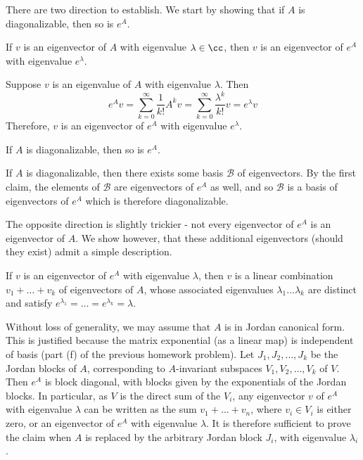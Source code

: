 \documentclass{scrartcl}
\begin{document}
\begin{solution} 
        There are two direction to establish. We start by showing that if $A$ is diagonalizable, then so is $e^A$.
        \begin{lemma}
        If $v$ is an eigenvector of $A$ with eigenvalue $\lambda\in \cc$, then $v$ is an eigenvector of $e^A$ with eigenvalue $e^\lambda$.
        \end{lemma}
        \begin{subproof}
        Suppose $v$ is an eigenvalue of $A$ with eigenvalue $\lambda$. Then 
        \[e^Av=\sum_{k=0}^{\infty}\frac{1}{k!}A^kv=\sum_{k=0}^{\infty}\frac{\lambda^k}{k!}v=e^\lambda v\]
        Therefore, $v$ is an eigenvector of $e^A$
         with eigenvalue $e^\lambda$.
         \end{subproof}
        
        \begin{lemma}
        If $A$ is diagonalizable, then so is $e^A$.
        \end{lemma}
        \begin{subproof}
        If $A$ is diagonalizable, then there exists some basis $\mathcal{B}$ of eigenvectors. By the first claim, the elements of $\mathcal{B}$ are eigenvectors of $e^A$ as well, and so $\mathcal{B}$ is a basis of eigenvectors of $e^A$ which is therefore diagonalizable.
        \end{subproof}
        
        The opposite direction is slightly trickier - not every eigenvector of $e^A$ is an eigenvector of $A$. We show however, that these additional eigenvectors (should they exist) admit a simple description. 
        
        \begin{lemma}
        If $v$ is an eigenvector of $e^A$ with eigenvalue $\lambda$, then $v$ is a linear combination $v_1+\dots +v_k$ of eigenvectors of $A$, whose associated eigenvalues $\lambda_1\dots \lambda_k$ are distinct and satisfy $e^{\lambda_1}=\dots=e^{\lambda_k}=\lambda$.
        \end{lemma}
            
        \begin{subproof}
        Without loss of generality, we may assume that $A$ is in Jordan canonical form. This is justified because the matrix exponential (as a linear map) is independent of basis (part (f) of the previous homework problem). Let $J_1,J_2,\dots, J_k$ be the Jordan blocks of $A$, corresponding to $A$-invariant subspaces $V_1,V_2,\dots, V_k$ of $V$. Then $e^A$ is block diagonal, with blocks given by the exponentials of the Jordan blocks. In particular, as $V$ is the direct sum of the $V_i$, any eigenvector $v$ of $e^A$ with eigenvalue $\lambda$ can be written as the sum $v_1+\dots + v_n$, where $v_i\in V_i$ is either zero, or an eigenvector of $e^A$ with eigenvalue $\lambda$. It is therefore sufficient to prove the claim when $A$ is replaced by the arbitrary Jordan block $J_i$, with eigenvalue $\lambda_i$.
        

\end{subproof}
\end{solution}
\end{document}
